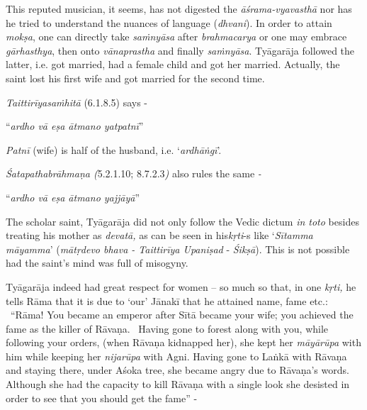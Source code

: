 This reputed musician, it seems, has not digested the \textit{āśrama-vyavasthā} nor has he tried to understand the nuances of language (\textit{dhvani}). In order to attain \textit{mokṣa}, one can directly take \textit{saṁnyāsa} after \textit{brahmacarya} or one may embrace \textit{gārhasthya}, then onto \textit{vānaprastha} and finally \textit{saṁnyāsa}. Tyāgarāja followed the latter, i.e. got married, had a female child and got her married. Actually, the saint lost his first wife and got married for the second time.

\textit{Taittirīyasaṁhitā} (6.1.8.5) says -

\begin{centerquote}
“\textit{ardho vā eṣa ātmano yatpatnī}”
\end{centerquote}

\textit{Patnī} (wife) is half of the husband, i.e. ‘\textit{ardhāṅgī}’.

\textit{Śatapathabrāhmaṇa (}5.2.1.10; 8.7.2.3\textit{)} also rules the same \textit{-}

\begin{centerquote}
“\textit{ardho vā eṣa ātmano yajjāyā}”
\end{centerquote}

The scholar saint, Tyāgarāja did not only follow the Vedic dictum \textit{in toto} besides treating his mother as \textit{devatā,} as can be seen in his\break \textit{kṛti}-s like ‘\textit{Sītamma māyamma}’ (\textit{mātṛdevo bhava - Taittirīya Upaniṣad} - \textit{Śikṣā}). This is not possible had the saint’s mind was full of misogyny.


Tyāgarāja indeed had great respect for women – so much so that, in one \textit{kṛti,} he tells Rāma that it is due to ‘our’ Jānakī that he attained name, fame etc.:  “Rāma! You became an emperor after Sītā became your wife; you achieved the fame as the killer of Rāvaṇa.  Having gone to forest along with you, while following your orders, (when Rāvaṇa kidnapped her), she kept her \textit{māyārūpa} with him while keeping her \textit{nijarūpa} with Agni. Having gone to Laṅkā with Rāvaṇa and staying there, under Aśoka tree, she became angry due to Rāvaṇa’s words. Although she had the capacity to kill Rāvaṇa with a single look she desisted in order to see that you should get the fame” -

